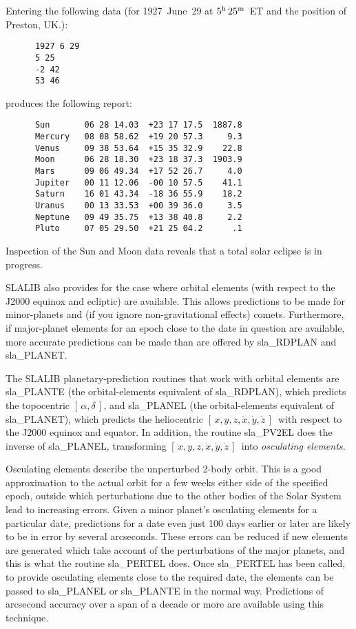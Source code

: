 \documentclass[11pt,twoside]{article}
\newcommand{\radec}     {$[\,\alpha,\delta\,]$}
\newcommand{\xyzxyzd}   {$[\,x,y,z,\dot{x},\dot{y},\dot{z}\,]$}
\begin{document}
Entering the following data (for 1927~June~29 at $5^{\rm h}\,25^{\rm m}$~ET
and the position of Preston, UK.):
\begin{verbatim}
      1927 6 29
      5 25
      -2 42
      53 46
\end{verbatim}
produces the following report:
\begin{verbatim}
      Sun       06 28 14.03  +23 17 17.5  1887.8
      Mercury   08 08 58.62  +19 20 57.3     9.3
      Venus     09 38 53.64  +15 35 32.9    22.8
      Moon      06 28 18.30  +23 18 37.3  1903.9
      Mars      09 06 49.34  +17 52 26.7     4.0
      Jupiter   00 11 12.06  -00 10 57.5    41.1
      Saturn    16 01 43.34  -18 36 55.9    18.2
      Uranus    00 13 33.53  +00 39 36.0     3.5
      Neptune   09 49 35.75  +13 38 40.8     2.2
      Pluto     07 05 29.50  +21 25 04.2      .1
\end{verbatim}
Inspection of the Sun and Moon data reveals that
a total solar eclipse is in progress.

SLALIB also provides for the case where orbital elements (with respect
to the J2000 equinox and ecliptic)
are available.  This allows predictions to be made for minor-planets and
(if you ignore non-gravitational effects)
comets.  Furthermore, if major-planet elements for an epoch close to the date
in question are available, more accurate predictions can be made than
are offered by
sla\_RDPLAN and
sla\_PLANET.

The SLALIB planetary-prediction
routines that work with orbital elements are
sla\_PLANTE (the orbital-elements equivalent of
sla\_RDPLAN), which predicts the topocentric \radec, and
sla\_PLANEL (the orbital-elements equivalent of
sla\_PLANET), which predicts the heliocentric \xyzxyzd\ with respect to the
J2000 equinox and equator.  In addition, the routine
sla\_PV2EL does the inverse of
sla\_PLANEL, transforming \xyzxyzd\ into {\it osculating elements.}

Osculating elements describe the unperturbed 2-body orbit.  This is
a good approximation to the actual orbit for a few weeks either
side of the specified epoch, outside which perturbations due to
the other bodies of the Solar System lead to
increasing errors.  Given a minor planet's osculating elements for
a particular date, predictions for a date even just
100 days earlier or later
are likely to be in error by several arcseconds.
These errors can
be reduced if new elements are generated which take account of
the perturbations of the major planets, and this is what the routine
sla\_PERTEL does.  Once
sla\_PERTEL has been called, to provide osculating elements
close to the required date, the elements can be passed to
sla\_PLANEL or
sla\_PLANTE in the normal way.  Predictions of arcsecond accuracy
over a span of a decade or more are available using this
technique.
\end{document}
